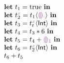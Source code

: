 

\newcommand{\THole}{\ensuremath{\SyEHole{\cdot}}}
\newcommand{\TInt}{\ensuremath{\SyTInt}}

\newcommand{\ELet}[2]{\ensuremath{\SyLet #1 = #2}}
\newcommand{\ELetAnn}[3]{\ensuremath{\SyLet #1 \SyColon #2 = #3}}
\newcommand{\EInn}{\ensuremath{\SyInn}}
\newcommand{\EIn}[1]{\ensuremath{\SyIn #1}}
\newcommand{\EPlus}[2]{\ensuremath{#1 \SyPlus #2}}
\newcommand{\ETimes}[2]{\ensuremath{#1 \SyTimes #2}}
\newcommand{\ECast}[2]{\ensuremath{#1 \SyCastL #2 \SyCastR}}

\newcommand{\ETrue}{\ensuremath{\SyTrue}}
\newcommand{\EEHole}[1]{\ensuremath{\SyEHole{#1}}}

\newcommand{\ENamed}[2]{\ensuremath{t_{#1}^{{\color{gray}#2}}}}


  \[\begin{array}{l}
    \ELet{t_1}{\ETrue} \EInn \\
    \ELet{\ENamed{2}{x}}{\ECast{t_1}{\THole}} \EInn \\
    \ELet{t_3}{\ECast{\ENamed{t}{x}}{\TInt}} \EInn \\
    \ELet{t_4}{\ETimes{t_3}{6}} \EInn \\
    \ELet{t_5}{\EPlus{t_4}{\EEHole{1}}} \EInn \\
    \ELet{t_6}{\ECast{\ENamed{2}{x}}{\TInt}} \EInn \\
    {\EPlus{t_6}{t_5}}
  \end{array}\]

